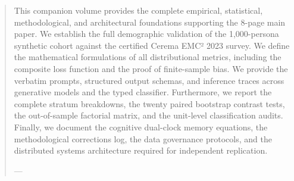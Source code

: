 \begin{abstract}
This companion volume provides the complete empirical, statistical, methodological, and architectural foundations supporting the 8-page main paper. We establish the full demographic validation of the 1,000-persona synthetic cohort against the certified Cerema EMC² 2023 survey. We define the mathematical formulations of all distributional metrics, including the composite loss function and the proof of finite-sample bias. We provide the verbatim prompts, structured output schemas, and inference traces across generative models and the typed classifier. Furthermore, we report the complete stratum breakdowns, the twenty paired bootstrap contrast tests, the out-of-sample factorial matrix, and the unit-level classification audits. Finally, we document the cognitive dual-clock memory equations, the methodological corrections log, the data governance protocols, and the distributed systems architecture required for independent replication.

---
\end{abstract}
